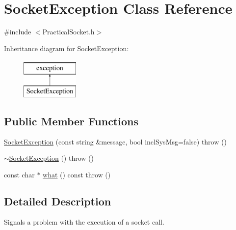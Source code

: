 \hypertarget{classSocketException}{\section{Socket\-Exception Class Reference}
\label{classSocketException}
}


{\ttfamily \#include $<$Practical\-Socket.\-h$>$}

Inheritance diagram for Socket\-Exception\-:\begin{figure}[H]
\begin{center}
\leavevmode
\includegraphics[height=2.000000cm]{classSocketException}
\end{center}
\end{figure}
\subsection*{Public Member Functions}
\begin{DoxyCompactItemize}
\item 
\hyperlink{classSocketException_abb5bcecd9d9e20868c237ec5a82cf5c3}{Socket\-Exception} (const string \&message, bool incl\-Sys\-Msg=false)  throw ()
\item 
\hyperlink{classSocketException_a659557c899329aea01977c980c4db9b9}{$\sim$\-Socket\-Exception} ()  throw ()
\item 
const char $\ast$ \hyperlink{classSocketException_a06b7b3f186976bb5ec7e7bf007c4f0ac}{what} () const   throw ()
\end{DoxyCompactItemize}


\subsection{Detailed Description}
Signals a problem with the execution of a socket call. 

